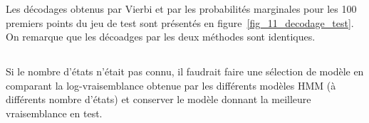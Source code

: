 \documentclass[12pt,a4paper,onecolumn]{article}
\begin{document}
Les décodages obtenus par Vierbi et par les probabilités marginales pour les 100 premiers points du jeu de test sont présentés en figure~\ref{fig_11_decodage_test}. On remarque que les décoadges par les deux méthodes sont identiques.

\subsection{}

Si le nombre d'états n'était pas connu, il faudrait faire une sélection de modèle en comparant la log-vraisemblance obtenue par les différents modèles HMM (à différents nombre d'états) et conserver le modèle donnant la meilleure vraisemblance en test.
\end{document}
